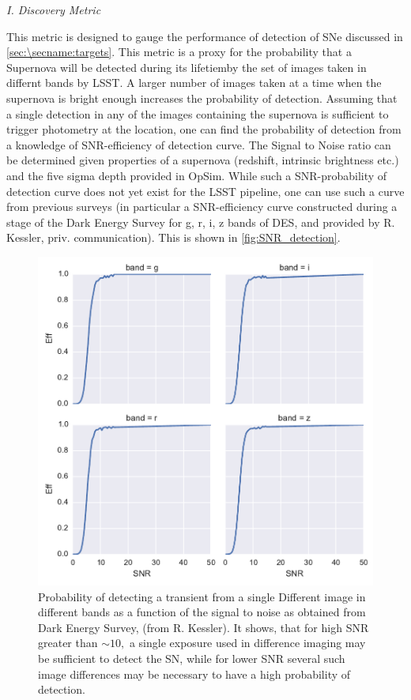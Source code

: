\emph{I. Discovery Metric}

This metric is designed to gauge the performance of detection of SNe 
discussed in \autoref{sec:\secname:targets}.
This metric is a proxy for the probability that a Supernova will be detected
 during its lifetiemby the set of images taken in differnt bands by LSST. A larger
 number of images taken at a time when the supernova is bright enough increases the
 probability of detection. Assuming that a single detection in any of the images containing
 the supernova is sufficient to trigger photometry at the location, one can find the
 probability of detection from a knowledge of SNR-efficiency of detection curve. The Signal to
Noise ratio can be determined given properties of a supernova (redshift, intrinsic brightness etc.)
 and the five sigma depth provided in OpSim. While such a SNR-probability of detection curve does not
 yet exist for the LSST pipeline, one can use such a curve from previous surveys (in particular a
 SNR-efficiency curve constructed during a stage of the Dark Energy Survey for g, r, i, z bands of DES,
 and provided by R. Kessler, priv. communication). This is shown in \autoref{fig:SNR_detection}.
\begin{figure}
 \centering
 \includegraphics[width=\textwidth]{figs/supernova/SNR_detection.pdf}
 \caption{Probability of detecting a transient from a single Different image in different bands as a
 function of the signal to noise as obtained from Dark Energy Survey, (from R. Kessler). It shows, that 
for high SNR greater than $\sim 10,$ a single exposure used in difference imaging may be sufficient to detect the SN, while for 
lower SNR several such image differences may be necessary to have a high probability of detection.}
 \label{fig:SNR_detection}
\end{figure}






